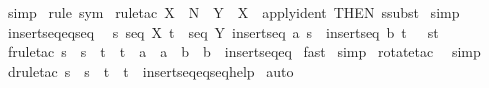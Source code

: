 \begin{isabellebody}
\isamarkupfalse%
\ simp\isanewline
{}\isamarkupfalse%
\ {\isacharparenleft}rule\ sym{\isacharparenright}\isanewline
{}\isamarkupfalse%
\ {\isacharparenleft}rule{\isacharunderscore}tac\ X{}\ {\isacharequal}\ {\isachardoublequoteopen}{\isacharpercent}N{\isachardoublequoteclose}\ \ Y{}\ {\isacharequal}\ {\isachardoublequoteopen}X{\isachardoublequoteclose}\ \ apply{\isacharunderscore}ident\ {\isacharbrackleft}THEN\ ssubst{\isacharbrackright}{\isacharparenright}\isanewline
{}\isamarkupfalse%
\ simp{\isacharplus}\isanewline
{}\isamarkupfalse%
%
\endisatagproof
{\isafoldproof}%
%
\isadelimproof
\isanewline
%
\endisadelimproof
\isanewline
\isanewline
{}\isamarkupfalse%
\ insertseq{\isacharunderscore}eq{\isacharunderscore}seq{\isacharcolon}\ \isanewline
{\isachardoublequoteopen}{\isacharbrackleft}{\isacharbar}\ s{\isacharcolon}\ seq\ X{\isacharsemicolon}\ t\ {\isacharcolon}\ seq\ Y{\isacharsemicolon}\ insertseq\ a\ s\ {\isacharequal}\ insertseq\ b\ t{\isacharbar}{\isacharbrackright}\ \ {\isacharequal}{\isacharequal}{\isachargreater}\ {\isacharparenleft}s{\isacharequal}t{\isacharparenright}{\isachardoublequoteclose}\isanewline
%
\isadelimproof
%
\endisadelimproof
%
\isatagproof
{}\isamarkupfalse%
\ {\isacharparenleft}frule{\isacharunderscore}tac\ s\ {\isacharequal}\ {\isachardoublequoteopen}s{\isachardoublequoteclose}\ \ t\ {\isacharequal}\ {\isachardoublequoteopen}t{\isachardoublequoteclose}\ \ a\ {\isacharequal}\ {\isachardoublequoteopen}a{\isachardoublequoteclose}\ \ b\ {\isacharequal}\ {\isachardoublequoteopen}b{\isachardoublequoteclose}\ \ insertseq{\isacharunderscore}eq{\isacharparenright}\isanewline
{}\isamarkupfalse%
\ fast\isanewline
{}\isamarkupfalse%
\ simp\isanewline
{}\isamarkupfalse%
\ {\isacharparenleft}rotate{\isacharunderscore}tac\ {\isacharminus}{}{\isacharparenright}\isanewline
{}\isamarkupfalse%
\ simp\isanewline
{}\isamarkupfalse%
\ {\isacharparenleft}drule{\isacharunderscore}tac\ s\ {\isacharequal}\ {\isachardoublequoteopen}s{\isachardoublequoteclose}\ \ t\ {\isacharequal}\ {\isachardoublequoteopen}t{\isachardoublequoteclose}\ \ insertseq{\isacharunderscore}eq{\isacharunderscore}seq{\isacharunderscore}help{\isacharparenright}\isanewline
{}\isamarkupfalse%
\ auto\isanewline
{}\isamarkupfalse%

\end{isabellebody}
